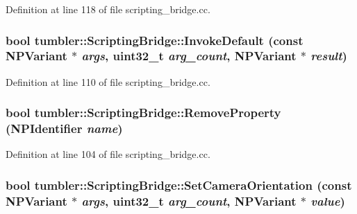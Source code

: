 Definition at line 118 of file scripting\_\-bridge.cc.

\hypertarget{classtumbler_1_1_scripting_bridge_abc3713f16c739bb1c547def1afc5c93c}{
\subsubsection[{InvokeDefault}]{\setlength{\rightskip}{0pt plus 5cm}bool tumbler::ScriptingBridge::InvokeDefault (const {\bf NPVariant} $\ast$ {\em args}, \/  uint32\_\-t {\em arg\_\-count}, \/  {\bf NPVariant} $\ast$ {\em result})}}
\label{classtumbler_1_1_scripting_bridge_abc3713f16c739bb1c547def1afc5c93c}


Definition at line 110 of file scripting\_\-bridge.cc.

\hypertarget{classtumbler_1_1_scripting_bridge_a58c45c6be183d37e0fa26de95b4410a1}{
\subsubsection[{RemoveProperty}]{\setlength{\rightskip}{0pt plus 5cm}bool tumbler::ScriptingBridge::RemoveProperty ({\bf NPIdentifier} {\em name})}}
\label{classtumbler_1_1_scripting_bridge_a58c45c6be183d37e0fa26de95b4410a1}


Definition at line 104 of file scripting\_\-bridge.cc.

\hypertarget{classtumbler_1_1_scripting_bridge_a9e3ffd7304dc607ddecad7cb8774009a}{
\subsubsection[{SetCameraOrientation}]{\setlength{\rightskip}{0pt plus 5cm}bool tumbler::ScriptingBridge::SetCameraOrientation (const {\bf NPVariant} $\ast$ {\em args}, \/  uint32\_\-t {\em arg\_\-count}, \/  {\bf NPVariant} $\ast$ {\em value})}}
\label{classtumbler_1_1_scripting_bridge_a9e3ffd7304dc607ddecad7cb8774009a}


